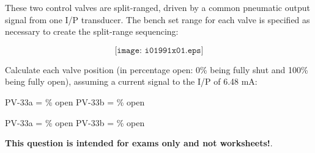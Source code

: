 

These two control valves are split-ranged, driven by a common pneumatic output signal from one I/P transducer.  The bench set range for each valve is specified as necessary to create the split-range sequencing:

$$\texttt{[image: i01991x01.eps]}$$

Calculate each valve position (in percentage open: 0\% being fully shut and 100\% being fully open), assuming a current signal to the I/P of 6.48 mA:

\vskip 20pt

\hskip 50pt PV-33a = \underbar{\hskip 50pt} \% open \hskip 60pt PV-33b = \underbar{\hskip 50pt} \% open







PV-33a =  \% open \hskip 100pt PV-33b =  \% open







{\bf This question is intended for exams only and not worksheets!}.


